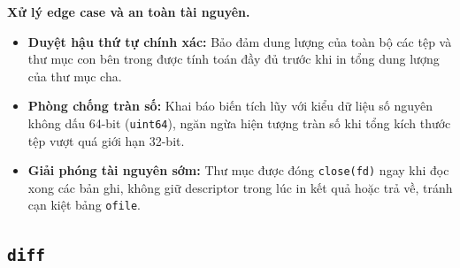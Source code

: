 \documentclass[12pt,a4paper]{article}
\begin{document}
\textbf{Xử lý edge case và an toàn tài nguyên.}
\begin{itemize}
  \item \textbf{Duyệt hậu thứ tự chính xác:} Bảo đảm dung lượng của toàn bộ các tệp và thư mục con bên trong được tính toán đầy đủ trước khi in tổng dung lượng của thư mục cha.
  \item \textbf{Phòng chống tràn số:} Khai báo biến tích lũy với kiểu dữ liệu số nguyên không dấu 64-bit (\texttt{uint64}), ngăn ngừa hiện tượng tràn số khi tổng kích thước tệp vượt quá giới hạn 32-bit.
  \item \textbf{Giải phóng tài nguyên sớm:} Thư mục được đóng \texttt{close(fd)} ngay khi đọc xong các bản ghi, không giữ descriptor trong lúc in kết quả hoặc trả về, tránh cạn kiệt bảng \texttt{ofile}.
\end{itemize}

\subsection{\texttt{diff}}
\end{document}
